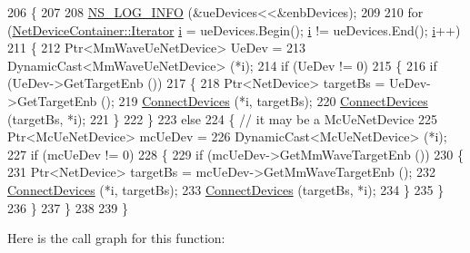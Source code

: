 \begin{DoxyCode}
206 \{
207 
208         \hyperlink{group__logging_gafbd73ee2cf9f26b319f49086d8e860fb}{NS\_LOG\_INFO} (&ueDevices<<&enbDevices);
209 
210         \textcolor{keywordflow}{for} (\hyperlink{classns3_1_1NetDeviceContainer_a45709bb572f975569ed985fa89b132f8}{NetDeviceContainer::Iterator} \hyperlink{bernuolliDistribution_8m_a6f6ccfcf58b31cb6412107d9d5281426}{i} = ueDevices.Begin(); 
      \hyperlink{bernuolliDistribution_8m_a6f6ccfcf58b31cb6412107d9d5281426}{i} != ueDevices.End(); \hyperlink{bernuolliDistribution_8m_a6f6ccfcf58b31cb6412107d9d5281426}{i}++)
211         \{
212                 Ptr<MmWaveUeNetDevice> UeDev =
213                                                 DynamicCast<MmWaveUeNetDevice> (*i);
214                 \textcolor{keywordflow}{if} (UeDev != 0) 
215                 \{
216                         \textcolor{keywordflow}{if} (UeDev->GetTargetEnb ())
217                         \{
218                                 Ptr<NetDevice> targetBs = UeDev->GetTargetEnb ();
219                                 \hyperlink{classns3_1_1MmWaveChannelRaytracing_a8f1e187d23f0de1b906d97eab364e3b5}{ConnectDevices} (*i, targetBs);
220                                 \hyperlink{classns3_1_1MmWaveChannelRaytracing_a8f1e187d23f0de1b906d97eab364e3b5}{ConnectDevices} (targetBs, *i);
221                         \}
222                 \}
223                 \textcolor{keywordflow}{else}
224                 \{       \textcolor{comment}{// it may be a McUeNetDevice}
225                         Ptr<McUeNetDevice> mcUeDev =
226                                                 DynamicCast<McUeNetDevice> (*i);
227                         \textcolor{keywordflow}{if} (mcUeDev != 0) 
228                         \{
229                                 \textcolor{keywordflow}{if} (mcUeDev->GetMmWaveTargetEnb ())
230                                 \{
231                                         Ptr<NetDevice> targetBs = mcUeDev->GetMmWaveTargetEnb ();
232                                         \hyperlink{classns3_1_1MmWaveChannelRaytracing_a8f1e187d23f0de1b906d97eab364e3b5}{ConnectDevices} (*i, targetBs);
233                                         \hyperlink{classns3_1_1MmWaveChannelRaytracing_a8f1e187d23f0de1b906d97eab364e3b5}{ConnectDevices} (targetBs, *i);
234                                 \}
235                         \}
236                 \}
237         \}
238 
239 \}
\end{DoxyCode}


Here is the call graph for this function\+:


